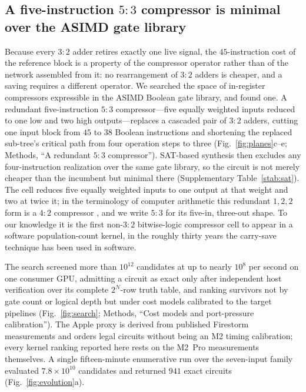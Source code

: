 \documentclass[fleqn,10pt]{wlscirep}
\begin{document}
\subsection*{A five-instruction $5{:}3$ compressor is minimal over the ASIMD gate library}

Because every $3{:}2$ adder retires exactly one live signal, the $45$-instruction cost of the reference block is a property of the compressor operator rather than of the network assembled from it: no rearrangement of $3{:}2$ adders is cheaper, and a saving requires a different operator. We searched the space of in-register compressors expressible in the ASIMD Boolean gate library, and found one. A redundant five-instruction $5{:}3$ compressor---five equally weighted inputs reduced to one low and two high outputs---replaces a cascaded pair of $3{:}2$ adders, cutting one input block from $45$ to $38$ Boolean instructions and shortening the replaced sub-tree's critical path from four operation steps to three (Fig.~\ref{fig:planes}c--e; Methods, ``A redundant $5{:}3$ compressor''). SAT-based synthesis then excludes any four-instruction realization over the same gate library, so the circuit is not merely cheaper than the incumbent but minimal there (Supplementary Table~\ref{stab:sat}). The cell reduces five equally weighted inputs to one output at that weight and two at twice it; in the terminology of computer arithmetic this redundant $1,2,2$ form is a $4{:}2$ compressor \cite{weinberger1981}, and we write $5{:}3$ for its five-in, three-out shape. To our knowledge it is the first non-$3{:}2$ bitwise-logic compressor cell to appear in a software population-count kernel, in the roughly thirty years the carry-save technique has been used in software.

The search screened more than $10^{12}$ candidates at up to nearly $10^{8}$ per second on one consumer GPU, admitting a circuit as exact only after independent host verification over its complete $2^{N}$-row truth table, and ranking survivors not by gate count or logical depth but under cost models calibrated to the target pipelines (Fig.~\ref{fig:search}; Methods, ``Cost models and port-pressure calibration''). The Apple proxy is derived from published Firestorm measurements and orders legal circuits without being an M2 timing calibration; every kernel ranking reported here rests on the M2~Pro measurements themselves. A single fifteen-minute enumerative run over the seven-input family evaluated $7.8\times10^{10}$ candidates and returned $941$ exact circuits (Fig.~\ref{fig:evolution}a).
\end{document}

